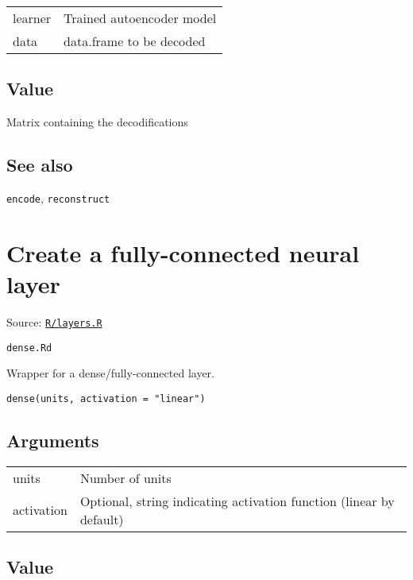 \begin{longtable}[c]{@{}ll@{}}
\toprule
learner & Trained autoencoder model\tabularnewline
data & data.frame to be decoded\tabularnewline
\bottomrule
\end{longtable}

\hypertarget{value}{\subsection{\texorpdfstring{\protect\hyperlink{value}{}Value}{Value}}\label{value}}

Matrix containing the decodifications

\hypertarget{see-also}{\subsection{\texorpdfstring{\protect\hyperlink{see-also}{}See
also}{See also}}\label{see-also}}

\texttt{encode}, \texttt{reconstruct}

\section{Create a fully-connected neural
layer}\label{create-a-fully-connected-neural-layer}

Source:
\href{https://github.com/fdavidcl/ruta/blob/master/R/layers.R}{\texttt{R/layers.R}}

\texttt{dense.Rd}

Wrapper for a dense/fully-connected layer.

\begin{verbatim}
dense(units, activation = "linear")
\end{verbatim}

\hypertarget{arguments}{\subsection{\texorpdfstring{\protect\hyperlink{arguments}{}Arguments}{Arguments}}\label{arguments}}

\begin{longtable}[c]{@{}ll@{}}
\toprule
units & Number of units\tabularnewline
activation & Optional, string indicating activation function (linear by
default)\tabularnewline
\bottomrule
\end{longtable}

\hypertarget{value}{\subsection{\texorpdfstring{\protect\hyperlink{value}{}Value}{Value}}\label{value}}

